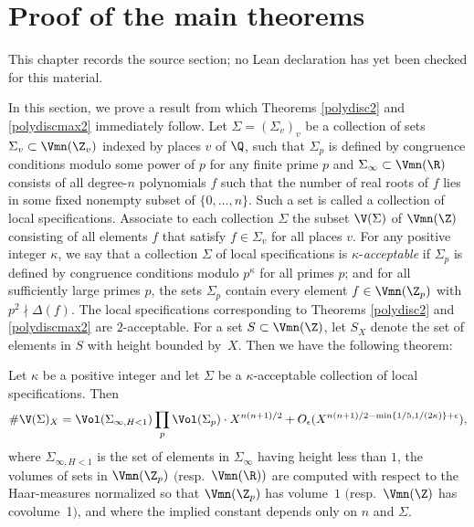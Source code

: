 \chapter{Proof of the main theorems}
\label{squarefree-values-polynomial-discriminants-chapter-04}

\begin{remark}
\label{squarefree-values-polynomial-discriminants-chapter-04-source}
This chapter records the source section; no Lean declaration has yet been checked for this material.
\notready
\end{remark}

\label{sec:sieve}

In this section, we prove a result from which Theorems \ref{polydisc2}
and \ref{polydiscmax2} immediately follow. Let $\Sigma=(\Sigma_v)_v$
be a collection of sets $\Sigma_v\subset \Vmn(\Z_v)$ indexed by places
$v$ of $\Q$, such that $\Sigma_p$ is defined by congruence conditions
modulo some power of $p$ for any finite prime $p$ and $\Sigma_\infty\subset\Vmn(\R)$ consists
of all degree-$n$ polynomials $f$ such that the number of real roots
of $f$ lies in some fixed nonempty subset of
$\{0,\ldots,n\}$. Such a set is called a collection of local specifications. Associate to each collection $\Sigma$ the subset
$\V(\Sigma)$ of $\Vmn(\Z)$ consisting of all elements $f$ that satisfy
$f\in\Sigma_v$ for all places $v$.  For any positive integer $\kappa$, we say that a collection
$\Sigma$ of local specifications is $\kappa$-{\it acceptable} if $\Sigma_p$ is defined by congruence conditions modulo $p^\kappa$ for all primes $p$; and for all
sufficiently large primes $p$, the sets $\Sigma_p$ contain every
element $f\in\Vmn(\Z_p)$ with $p^2\nmid\Delta(f)$. The local specifications corresponding to Theorems \ref{polydisc2}
and \ref{polydiscmax2} are $2$-acceptable. For a set $S\subset \Vmn(\Z)$, let $S_X$
denote the set of elements in $S$ with height bounded by~$X$. Then we have the
following theorem:

\begin{theorem}
\notready\label{thmaingencong}
Let $\kappa$ be a positive integer and let $\Sigma$ be a $\kappa$-acceptable collection of local specifications. Then
\begin{equation*}
\#\V(\Sigma)_X=\Vol(\Sigma_{\infty,H<1})\prod_p\Vol(\Sigma_p)\cdot
X^{n(n+1)/2}+O_\epsilon(X^{n(n+1)/2-\min\{1/5,1/(2\kappa)\}+\epsilon}),
\end{equation*}
where $\Sigma_{\infty,H<1}$ is the set of elements in $\Sigma_\infty$
having height less than $1$, the volumes of sets in $\Vmn(\Z_p)$
$($resp.\ $\Vmn(\R))$ are computed with respect to the Haar-measures
normalized so that $\Vmn(\Z_p)$ has volume~$1$ $($resp.\ $\Vmn(\Z)$ has
covolume~1$)$, and where the implied constant depends only on $n$ and $\Sigma$.
\end{theorem}

